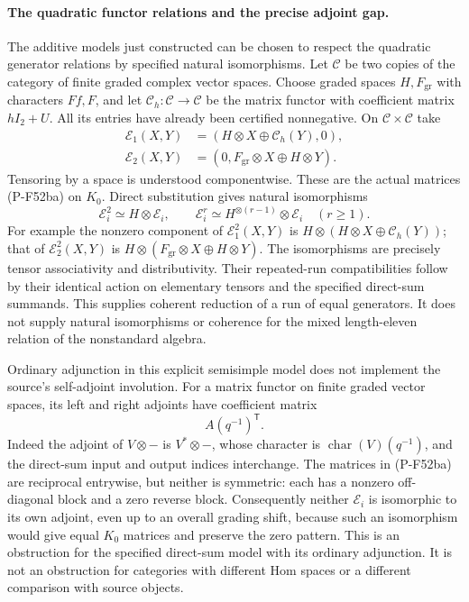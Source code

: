 \documentclass[11pt,a4paper]{article}
\begin{document}
\paragraph{The quadratic functor relations and the precise adjoint gap.}
The additive models just constructed can be chosen to respect
the quadratic generator relations by specified natural
isomorphisms. Let $\mathscr C$ be two copies of the category
of finite graded complex vector spaces. Choose graded spaces
$H,F_{\mathrm{gr}}$ with characters $Ff,F$, and let
$\mathscr C_h:\mathscr C\to\mathscr C$ be the matrix
functor with coefficient matrix $hI_2+U$. All its entries
have already been certified nonnegative. On
$\mathscr C\times\mathscr C$ take
\[
 \begin{split}
 \mathscr E_1(X,Y)&=(H\otimes X\oplus\mathscr C_h(Y),0),\\
 \mathscr E_2(X,Y)&=(0,F_{\mathrm{gr}}\otimes X\oplus H\otimes Y).
 \end{split}                                                    \tag{P-F52bd}
\]
Tensoring by a space is understood componentwise. These are
the actual matrices (P-F52ba) on $K_0$. Direct substitution
gives natural isomorphisms
\[
       \mathscr E_i^2\simeq H\otimes\mathscr E_i,
       \qquad
       \mathscr E_i^r\simeq
                     H^{\otimes(r-1)}\otimes\mathscr E_i
                     \quad(r\ge1).
                                                               \tag{P-F52be}
\]
For example the nonzero component of $\mathscr E_1^2(X,Y)$
is $H\otimes(H\otimes X\oplus\mathscr C_h(Y))$;
that of $\mathscr E_2^2(X,Y)$ is
$H\otimes(F_{\mathrm{gr}}\otimes X\oplus H\otimes Y)$.
The isomorphisms are precisely tensor associativity and
distributivity. Their repeated-run compatibilities follow
by their identical action on elementary tensors and the
specified direct-sum summands. This supplies coherent
reduction of a run of equal generators. It does not supply
natural isomorphisms or coherence for the mixed
length-eleven relation of the nonstandard algebra.

Ordinary adjunction in this explicit semisimple model does
not implement the source's self-adjoint involution.
For a matrix functor on finite graded vector spaces, its
left and right adjoints have coefficient matrix
\[
                         A(q^{-1})^{\mathsf T}.
                                                               \tag{P-F52bf}
\]
Indeed the adjoint of $V\otimes-$ is $V^*\otimes-$,
whose character is $\operatorname{char}(V)(q^{-1})$,
and the direct-sum input and output indices interchange.
The matrices in (P-F52ba) are reciprocal entrywise, but
neither is symmetric: each has a nonzero off-diagonal
block and a zero reverse block. Consequently neither
$\mathscr E_i$ is isomorphic to its own adjoint, even
up to an overall grading shift, because such an
isomorphism would give equal $K_0$ matrices and preserve
the zero pattern. This is an obstruction for the
specified direct-sum model with its ordinary adjunction.
It is not an obstruction for categories with different
Hom spaces or a different comparison with source objects.
\end{document}
